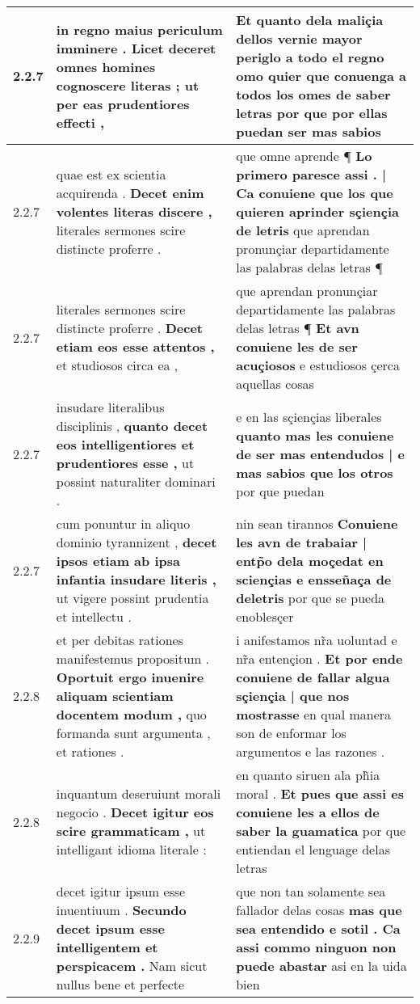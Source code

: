 \begin{tabular}{|p{1cm}|p{6.5cm}|p{6.5cm}|}
2.2.7 & in regno maius periculum imminere . \textbf{ Licet deceret omnes homines cognoscere literas ; } ut per eas prudentiores effecti , & Et quanto dela maliçia dellos vernie mayor periglo a todo el regno \textbf{ omo quier que conuenga a todos los omes de saber letras } por que por ellas puedan ser mas sabios \\\hline
2.2.7 & quae est ex scientia acquirenda . \textbf{ Decet enim volentes literas discere , } literales sermones scire distincte proferre . & que omne aprende ¶ \textbf{ Lo primero paresce assi . | Ca conuiene que los que quieren aprinder sçiençia de letris } que aprendan pronunçiar departidamente las palabras delas letras ¶ \\\hline
2.2.7 & literales sermones scire distincte proferre . \textbf{ Decet etiam eos esse attentos , } et studiosos circa ea , & que aprendan pronunçiar departidamente las palabras delas letras ¶ \textbf{ Et avn conuiene les de ser acuçiosos } e estudiosos çerca aquellas cosas \\\hline
2.2.7 & insudare literalibus disciplinis , \textbf{ quanto decet eos intelligentiores et prudentiores esse , } ut possint naturaliter dominari . & e en las sçiençias liberales \textbf{ quanto mas les conuiene de ser mas entendudos | e mas sabios que los otros } por que puedan \\\hline
2.2.7 & cum ponuntur in aliquo dominio tyrannizent , \textbf{ decet ipsos etiam ab ipsa infantia insudare literis , } ut vigere possint prudentia et intellectu . & nin sean tirannos \textbf{ Conuiene les avn de trabaiar | entp̃o dela moçedat en sciençias e ensseñaça de deletris } por que se pueda enoblesçer \\\hline
2.2.8 & et per debitas rationes manifestemus propositum . \textbf{ Oportuit ergo inuenire aliquam scientiam docentem modum , } quo formanda sunt argumenta , et rationes . & i anifestamos nr̃a uoluntad e nr̃a entençion . \textbf{ Et por ende conuiene de fallar algua sçiençia | que nos mostrasse } en qual manera son de enformar los argumentos e las razones . \\\hline
2.2.8 & inquantum deseruiunt morali negocio . \textbf{ Decet igitur eos scire grammaticam , } ut intelligant idioma literale : & en quanto siruen ala ph̃ia moral . \textbf{ Et pues que assi es conuiene les a ellos de saber la guamatica } por que entiendan el lenguage delas letras \\\hline
2.2.9 & decet igitur ipsum esse inuentiuum . \textbf{ Secundo decet ipsum esse intelligentem et perspicacem . } Nam sicut nullus bene et perfecte & que non tan solamente sea fallador delas cosas \textbf{ mas que sea entendido e sotil . Ca assi commo ninguon non puede abastar } asi en la uida bien \\\hline

\end{tabular}
